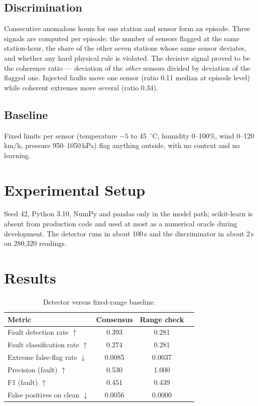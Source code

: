 \documentclass[conference]{IEEEtran}
\begin{document}
\subsection{Discrimination}
Consecutive anomalous hours for one station and sensor form an episode. Three signals are computed
per episode: the number of sensors flagged at the same station-hour, the share of the other seven
stations whose same sensor deviates, and whether any hard physical rule is violated. The decisive
signal proved to be the coherence ratio --- deviation of the \emph{other} sensors divided by deviation
of the flagged one. Injected faults move one sensor (ratio 0.11 median at episode level) while
coherent extremes move several (ratio 0.34).

\subsection{Baseline}
Fixed limits per sensor (temperature $-5$ to 45~$^\circ$C, humidity 0--100\%, wind 0--120\,km/h,
pressure 950--1050\,hPa) flag anything outside, with no context and no learning.

\section{Experimental Setup}
Seed 42, Python 3.10, NumPy and pandas only in the model path; scikit-learn is absent from production
code and used at most as a numerical oracle during development. The detector runs in about 100\,s and
the discriminator in about 2\,s on 280{,}320 readings.

\section{Results}
\begin{table}[ht]
\centering
\caption{Detector versus fixed-range baseline.}
\label{tab:main}
\begin{tabular}{lccc}
\toprule
Metric & Consensus & Range check \\
\midrule
Fault detection rate $\uparrow$ & 0.393 & 0.281 \\
Fault classification rate $\uparrow$ & 0.274 & 0.281 \\
Extreme false-flag rate $\downarrow$ & 0.0085 & 0.0037 \\
Precision (fault) $\uparrow$ & 0.530 & 1.000 \\
F1 (fault) $\uparrow$ & 0.451 & 0.439 \\
False positives on clean $\downarrow$ & 0.0056 & 0.0000 \\
\bottomrule
\end{tabular}
\end{table}
\end{document}
